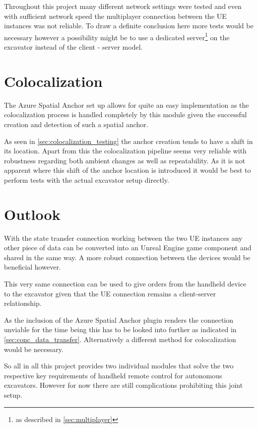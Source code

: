 Throughout this project many different network settings were tested and even with sufficient network speed the multiplayer connection between the UE instances was not reliable. To draw a definite conclusion here more tests would be necessary however a possibility might be to use a dedicated server\footnote{as described in \cref{sec:multiplayer}} on the excavator instead of the client - server model.

\section{Colocalization}\label{sec:conc_colocalization}

The Azure Spatial Anchor set up allows for quite an easy implementation as the colocalization process is handled completely by this module given the successful creation and detection of such a spatial anchor.

As seen in \cref{sec:colocalization_testing} the anchor creation tends to have a shift in its location. Apart from this the colocalization pipeline seems very reliable with robustness regarding both ambient changes as well as repeatability. As it is not apparent where this shift of the anchor location is introduced it would be best to perform tests with the actual excavator setup directly. 

\section{Outlook}\label{sec:outlook}

 With the state transfer connection working between the two UE instances any other piece of data can be converted into an Unreal Engine game component and shared in the same way. A more robust connection between the devices would be beneficial however.
 
 This very same connection can be used to give orders from the handheld device to the excavator given that the UE connection remains a client-server relationship.

As the inclusion of the Azure Spatial Anchor plugin renders the connection unviable for the time being this has to be looked into further as indicated in \cref{sec:conc_data_transfer}. Alternatively a different method for colocalization would be necessary. 

So all in all this project provides two individual modules that solve the two respective key requirements of handheld remote control for autonomous excavators. However for now there are still complications prohibiting this joint setup.

